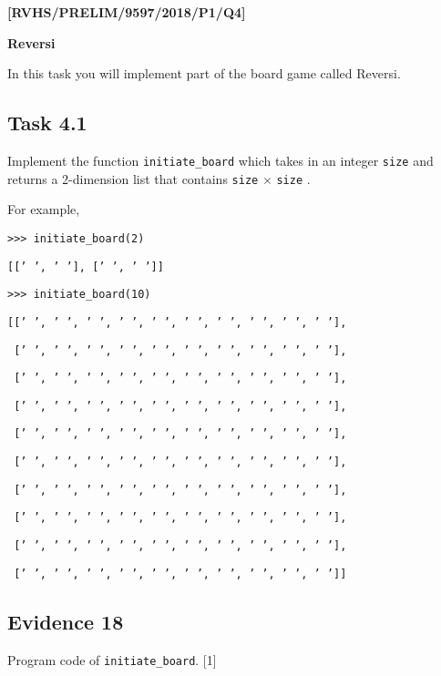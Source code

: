 \item \textbf{{[}RVHS/PRELIM/9597/2018/P1/Q4{]} }

\textbf{Reversi }

In this task you will implement part of the board game called Reversi. 

\subsection*{Task 4.1 }

Implement the function \texttt{initiate\_board} which takes in an
integer \texttt{size} and returns a 2-dimension list that contains
\texttt{size} $\times$ \texttt{size} \textquotedbl{} \textquotedbl .

For example, 

\noindent %
\noindent\begin{minipage}[t]{1\columnwidth}%
\texttt{>\textcompwordmark >\textcompwordmark > initiate\_board(2)}

\texttt{{[}{[}' ', ' '{]}, {[}' ', ' '{]}{]} }

\texttt{>\textcompwordmark >\textcompwordmark > initiate\_board(10) }

\texttt{{[}{[}' ', ' ', ' ', ' ', ' ', ' ', ' ', ' ', ' ', ' '{]},}

\texttt{~{[}' ', ' ', ' ', ' ', ' ', ' ', ' ', ' ', ' ', ' '{]}, }

\texttt{~{[}' ', ' ', ' ', ' ', ' ', ' ', ' ', ' ', ' ', ' '{]}, }

\texttt{~{[}' ', ' ', ' ', ' ', ' ', ' ', ' ', ' ', ' ', ' '{]}, }

\texttt{~{[}' ', ' ', ' ', ' ', ' ', ' ', ' ', ' ', ' ', ' '{]}, }

\texttt{~{[}' ', ' ', ' ', ' ', ' ', ' ', ' ', ' ', ' ', ' '{]}, }

\texttt{~{[}' ', ' ', ' ', ' ', ' ', ' ', ' ', ' ', ' ', ' '{]},}

\texttt{~{[}' ', ' ', ' ', ' ', ' ', ' ', ' ', ' ', ' ', ' '{]},}

\texttt{~{[}' ', ' ', ' ', ' ', ' ', ' ', ' ', ' ', ' ', ' '{]},}

\texttt{~{[}' ', ' ', ' ', ' ', ' ', ' ', ' ', ' ', ' ', ' '{]}{]}}%
\end{minipage}

\subsection*{Evidence 18}

Program code of \texttt{initiate\_board}. \hfill{}{[}1{]}

